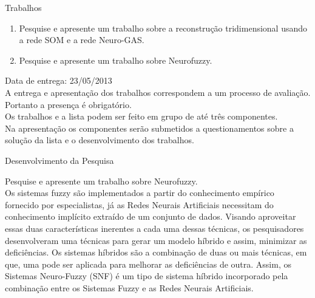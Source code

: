 \documentclass[a4paper,oneside,12pt]{article}
\begin{document}
\newpage

\begin{center}
Trabalhos
\end{center}

\begin{enumerate}[1.]
\item Pesquise e apresente um trabalho sobre a reconstru\c{c}\~ao tridimensional usando a rede SOM e a rede Neuro-GAS. \\

\item Pesquise e apresente um trabalho sobre Neurofuzzy. \\
	
\end{enumerate}

Data de entrega: 23/05/2013 \\

A entrega e apresenta\c{c}\~ao dos trabalhos correspondem a um processo de avalia\c{c}\~ao. Portanto a presen\c{c}a \'e obrigat\'orio. \\

Os trabalhos e a lista podem ser feito em grupo de at\'e tr\^es componentes. \\

Na apresenta\c{c}\~ao os componentes ser\~ao submetidos a questionamentos sobre a solu\c{c}\~ao da lista e o desenvolvimento dos trabalhos. \\

\newpage

\begin{center}
Desenvolvimento da Pesquisa
\end{center}

Pesquise e apresente um trabalho sobre Neurofuzzy. \\

Os sistemas fuzzy s\~ao implementados a partir do conhecimento emp\'irico fornecido por especialistas, j\'a as Redes Neurais Artificiais necessitam  do conhecimento impl\'icito extra\'ido de um conjunto de dados. Visando aproveitar essas duas caracter\'isticas inerentes a cada uma dessas t\'ecnicas, os pesquisadores desenvolveram uma t\'ecnicas para gerar um modelo h\'ibrido e assim, minimizar as defici\^encias.
Os sistemas h\'ibridos s\~ao a combina\c{c}\~ao de duas ou mais t\'ecnicas, em que, uma pode ser aplicada para melhorar as defici\^encias de outra.  Assim, os Sistemas Neuro-Fuzzy (SNF) \'e um tipo de sistema h\'ibrido incorporado pela combina\c{c}\~ao entre os Sistemas Fuzzy e as Redes Neurais Artificiais.
\end{document}
